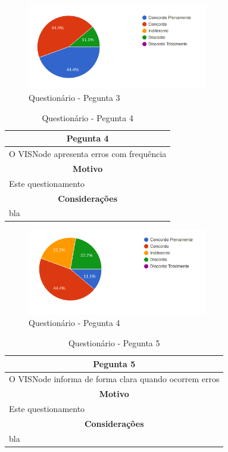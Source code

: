 \documentclass[
	12pt,				%
	oneside,			%
	a4paper,			%
	english,			%
	french,				%
	spanish,			%
	brazil,				%
	]{abntex2}
\begin{document}
\begin{figure}[H]
\centering
\caption{Questionário - Pegunta 3}
\includegraphics[width=0.7\textwidth]{imagens/v1/p3.png}
\sourceAuthor
\end{figure}

\begin{table}[H]
\centering
\caption{Questionário - Pegunta 4} 
\def\arraystretch{1.5}
\begin{tabular}{l}
\hline
\multicolumn{1}{c}{\textbf{Pegunta 4}}              \\ \hline
O VISNode apresenta erros com frequência \\ \hline
\multicolumn{1}{c}{\textbf{Motivo}}                 \\ \hline
Este questionamento                                   \\ \hline
\multicolumn{1}{c}{\textbf{Considerações}}          \\ \hline
bla                                                   \\ \hline
\end{tabular}
\sourceAuthor
\end{table}

\begin{figure}[H]
\centering
\caption{Questionário - Pegunta 4}
\includegraphics[width=0.7\textwidth]{imagens/v1/p4.png}
\sourceAuthor
\end{figure}

\begin{table}[H]
\centering
\caption{Questionário - Pegunta 5} 
\def\arraystretch{1.5}
\begin{tabular}{l}
\hline
\multicolumn{1}{c}{\textbf{Pegunta 5}}              \\ \hline
O VISNode informa de forma clara quando ocorrem erros \\ \hline
\multicolumn{1}{c}{\textbf{Motivo}}                 \\ \hline
Este questionamento                                   \\ \hline
\multicolumn{1}{c}{\textbf{Considerações}}          \\ \hline
bla                                                   \\ \hline
\end{tabular}
\sourceAuthor
\end{table}
\end{document}
